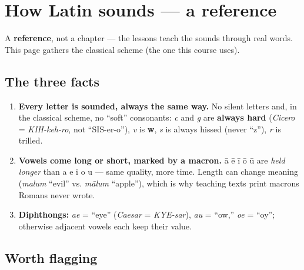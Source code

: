 
\chapter*{How Latin sounds --- a reference}

A \textbf{reference}, not a chapter — the lessons teach the sounds through real words. This page gathers the classical scheme (the one this course uses).

\section*{The three facts}

\begin{enumerate}
\raggedright
\setlength{\itemsep}{0.35em}
  \item \textbf{Every letter is sounded, always the same way.} No silent letters and, in the classical scheme, no \textquotedblleft{}soft\textquotedblright{} consonants: \emph{c} and \emph{g} are \textbf{always hard} (\emph{Cicero} = \emph{KIH-keh-ro}, not \textquotedblleft{}SIS-er-o\textquotedblright{}), \emph{v} is \textbf{w}, \emph{s} is always hissed (never \textquotedblleft{}z\textquotedblright{}), \emph{r} is trilled.
  \item \textbf{Vowels come long or short, marked by a macron.} ā ē ī ō ū are \emph{held longer} than a e i o u — same quality, more time. Length can change meaning (\emph{malum} \textquotedblleft{}evil\textquotedblright{} vs. \emph{mālum} \textquotedblleft{}apple\textquotedblright{}), which is why teaching texts print macrons Romans never wrote.
  \item \textbf{Diphthongs:} \emph{ae} = \textquotedblleft{}eye\textquotedblright{} (\emph{Caesar} = \emph{KYE-sar}), \emph{au} = \textquotedblleft{}ow,\textquotedblright{} \emph{oe} = \textquotedblleft{}oy\textquotedblright{}; otherwise adjacent vowels each keep their value.
\end{enumerate}

\section*{Worth flagging}

